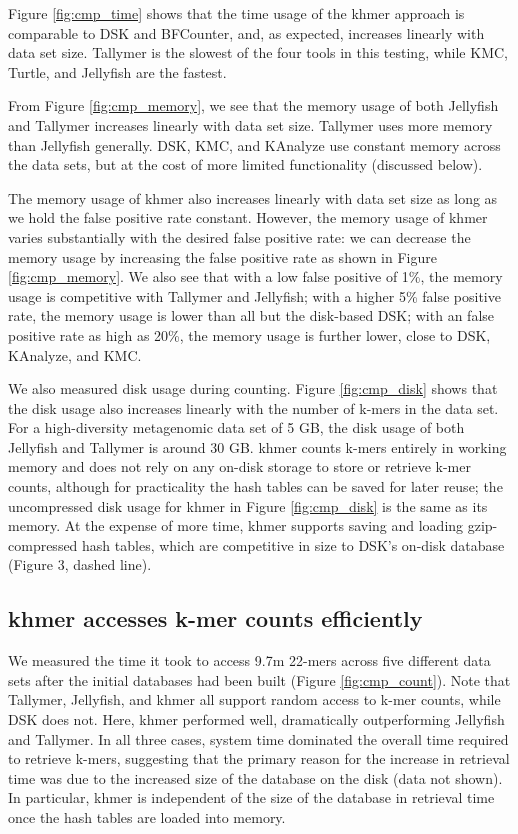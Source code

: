 \documentclass[10pt]{article}
\begin{document}
Figure \ref{fig:cmp_time} shows that the time usage of the khmer
approach is comparable to DSK and BFCounter, and, as expected,
increases linearly with data set size. Tallymer is the slowest of the
four tools in this testing, while KMC, Turtle, and Jellyfish are
the fastest.

From Figure \ref{fig:cmp_memory}, we see that the memory usage of both
Jellyfish and Tallymer increases linearly with data set size. Tallymer
uses more memory than Jellyfish generally.  DSK, KMC, and KAnalyze use
constant memory across the data sets, but at the cost of more limited
functionality (discussed below).

The memory usage of khmer also increases linearly with data set size
as long as we hold the false positive rate constant.  However, the
memory usage of khmer varies substantially with the desired false
positive rate: we can decrease the memory usage by increasing the
false positive rate as shown in Figure \ref{fig:cmp_memory}.  We also
see that with a low false positive of 1\%, the memory usage is
competitive with Tallymer and Jellyfish; with a higher 5\% false
positive rate, the memory usage is lower than all but the disk-based
DSK; with an false positive rate as high as 20\%, the memory usage is
further lower, close to DSK, KAnalyze, and KMC.

We also measured disk usage during counting.  Figure
\ref{fig:cmp_disk} shows that the disk usage also increases linearly
with the number of k-mers in the data set.  For a high-diversity
metagenomic data set of 5 GB, the disk usage of both Jellyfish and
Tallymer is around 30 GB.  khmer counts k-mers entirely in working
memory and does not rely on any on-disk storage to store or retrieve
k-mer counts, although for practicality the hash tables can be saved
for later reuse; the uncompressed disk usage for khmer in Figure
\ref{fig:cmp_disk} is the same as its memory.  At the expense of more
time, khmer supports saving and loading gzip-compressed hash tables,
which are competitive in size to DSK's on-disk database (Figure 3,
dashed line).

\subsection*{khmer accesses k-mer counts efficiently}

We measured the time it took to access 9.7m 22-mers across five
different data sets after the initial databases had been built (Figure
\ref{fig:cmp_count}).  Note that Tallymer, Jellyfish, and khmer all
support random access to k-mer counts, while DSK does not. Here, khmer
performed well, dramatically outperforming Jellyfish and Tallymer.  In
all three cases, system time dominated the overall time required to
retrieve k-mers, suggesting that the primary reason for the increase
in retrieval time was due to the increased size of the database on the
disk (data not shown).  In particular, khmer is independent of the
size of the database in retrieval time once the hash tables are loaded
into memory.
\end{document}

